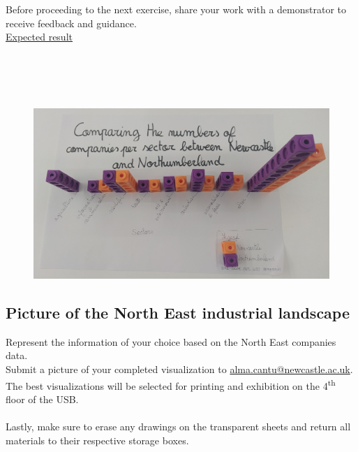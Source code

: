 \documentclass[11pt]{article}
\begin{document}
Before proceeding to the next exercise, share your work with a demonstrator to receive feedback and guidance.\\

\underline{Expected result}
\\
\\
\\
\\
\\

\begin{figure}[h!]
    \centering
    \includegraphics[width=.6\linewidth]{img/exe2-1.jpg}
\end{figure}

\subsection{Picture of the North East industrial landscape}

Represent the information of your choice based on the North East companies data.\\

Submit a picture of your completed visualization to \href{mailto:alma.cantu@newcaslte.ac.uk}{alma.cantu@newcastle.ac.uk}. The best visualizations will be selected for printing and exhibition on the 4\textsuperscript{th} floor of the USB.\\
\\

Lastly, make sure to erase any drawings on the transparent sheets and return all materials to their respective storage boxes.
\end{document}

